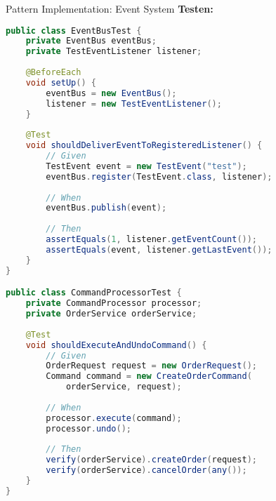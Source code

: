 \begin{example2}{Pattern Implementation: Event System}
\textbf{Testen:}
\begin{lstlisting}[language=Java, style=basesmol]
public class EventBusTest {
    private EventBus eventBus;
    private TestEventListener listener;
    
    @BeforeEach
    void setUp() {
        eventBus = new EventBus();
        listener = new TestEventListener();
    }
    
    @Test
    void shouldDeliverEventToRegisteredListener() {
        // Given
        TestEvent event = new TestEvent("test");
        eventBus.register(TestEvent.class, listener);
        
        // When
        eventBus.publish(event);
        
        // Then
        assertEquals(1, listener.getEventCount());
        assertEquals(event, listener.getLastEvent());
    }
}

public class CommandProcessorTest {
    private CommandProcessor processor;
    private OrderService orderService;
    
    @Test
    void shouldExecuteAndUndoCommand() {
        // Given
        OrderRequest request = new OrderRequest();
        Command command = new CreateOrderCommand(
            orderService, request);
            
        // When
        processor.execute(command);
        processor.undo();
        
        // Then
        verify(orderService).createOrder(request);
        verify(orderService).cancelOrder(any());
    }
}
\end{lstlisting}
\end{example2}


